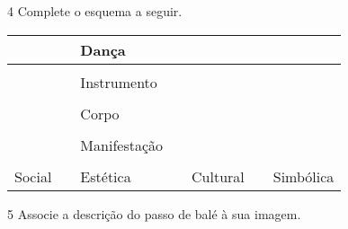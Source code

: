 \num{4}  Complete o esquema a seguir.


\begin{longtable}[]{@{}lllllll@{}}
\toprule
& & \textbf{Dança} & & &\tabularnewline
\midrule
\endhead
& & & & & &\tabularnewline
& & Instrumento & & &\tabularnewline
& & & & & &\tabularnewline
& & Corpo & & &\tabularnewline
& & & & & &\tabularnewline
& & Manifestação & &\tabularnewline
& & & & & &\tabularnewline
Social & & Estética & & Cultural & & Simbólica\tabularnewline
\bottomrule
\end{longtable}


\num{5}  Associe a descrição do passo de balé à sua imagem.

%
%
%
%
%
%

